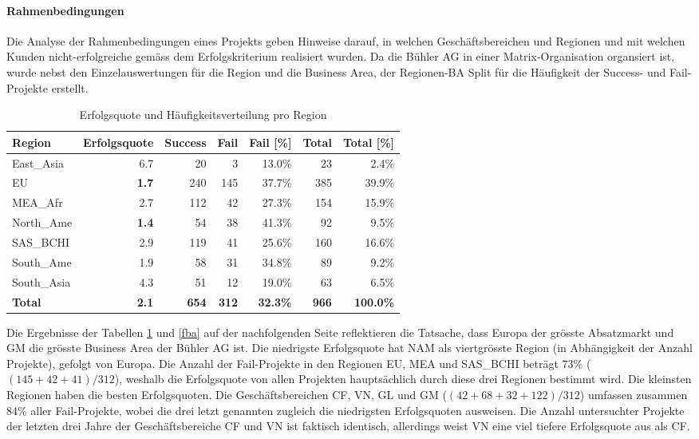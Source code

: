 \paragraph{Rahmenbedingungen}
Die Analyse der Rahmenbedingungen eines Projekts geben Hinweise darauf, in welchen Geschäftsbereichen und Regionen und mit welchen Kunden nicht-erfolgreiche gemäss dem Erfolgskriterium realisiert wurden. Da die Bühler AG in einer Matrix-Organisation organsiert ist, wurde nebst den Einzelauswertungen für die Region und die Business Area, der Regionen-BA Split für die Häufigkeit der Success- und Fail-Projekte erstellt.
\begin{table}[H]
	\centering
	\caption{Erfolgsquote und Häufigkeitsverteilung pro Region}
	\begin{tabular}{lrrrrrr}
		\textbf{Region} & \multicolumn{1}{l}{\textbf{Erfolgsquote}} & \multicolumn{1}{l}{\textbf{Success}} & \multicolumn{1}{l}{\textbf{Fail}} & \multicolumn{1}{l}{\textbf{Fail [\%]}} & \multicolumn{1}{l}{\textbf{Total}} & \multicolumn{1}{l}{\textbf{Total [\%]}} \\ \hline
		East\_Asia & 6.7   & 20    & 3     & 13.0\% & 23    & 2.4\% \\
		EU    & \textbf{1.7}   & 240   & 145   & 37.7\% & 385   & 39.9\% \\
		MEA\_Afr & 2.7   & 112   & 42    & 27.3\% & 154   & 15.9\% \\
		North\_Ame & \textbf{1.4}   & 54    & 38    & 41.3\% & 92    & 9.5\% \\
		SAS\_BCHI & 2.9   & 119   & 41    & 25.6\% & 160   & 16.6\% \\
		South\_Ame & 1.9   & 58    & 31    & 34.8\% & 89    & 9.2\% \\
		South\_Asia & 4.3   & 51    & 12    & 19.0\% & 63    & 6.5\% \\ \hline
		\textbf{Total} & \textbf{2.1} & \textbf{654} & \textbf{312} & \textbf{32.3\%} & \textbf{966} & \textbf{100.0\%} \\
	\end{tabular}%
	\label{freg}%
\end{table}%
Die Ergebnisse der Tabellen \ref{freg} und \ref{fba} auf der nachfolgenden Seite reflektieren die Tatsache, dass Europa der grösste Absatzmarkt und GM die grösste Business Area der Bühler AG ist. Die niedrigste Erfolgsquote hat NAM als viertgrösste Region (in Abhängigkeit der Anzahl Projekte), gefolgt von Europa. Die Anzahl der Fail-Projekte in den Regionen EU, MEA und SAS\_BCHI beträgt 73\% ($(145+42+41)/312$), weshalb die Erfolgsquote von allen Projekten hauptsächlich durch diese drei Regionen bestimmt wird. Die kleinsten Regionen haben die besten Erfolgsquoten. Die Geschäftsbereichen CF, VN, GL und GM ($(42+68+32+122)/312$) umfassen zusammen 84\% aller Fail-Projekte, wobei die drei letzt genannten zugleich die niedrigsten Erfolgsquoten ausweisen. Die Anzahl untersuchter Projekte der letzten drei Jahre der Geschäftsbereiche CF und VN ist faktisch identisch, allerdings weist VN eine viel tiefere Erfolgsquote aus als CF.
